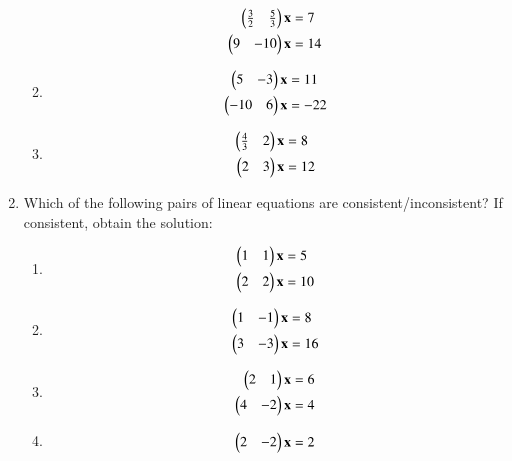 \begin{enumerate}[label=\arabic*.,ref=\thesubsection.\theenumi]
\begin{enumerate}[itemsep=2pt]
\begin{align}
\begin{split}
\begin{pmatrix}\frac{3}{2} & \frac{5}{3} \end{pmatrix}\mathbf{x}&=7
\\
\begin{pmatrix}9 & -10 \end{pmatrix}\mathbf{x}&=14
\end{split}
\end{align}
\item
\begin{align}
\begin{split}
\begin{pmatrix}5 & -3 \end{pmatrix}\mathbf{x}&=11
\\
\begin{pmatrix}-10 & 6 \end{pmatrix}\mathbf{x}&=-22
\end{split}
\end{align}
\item
\begin{align}
\begin{split}
\begin{pmatrix}\frac{4}{3} & 2 \end{pmatrix}\mathbf{x}&=8
\\
\begin{pmatrix}2 & 3 \end{pmatrix}\mathbf{x}&=12
\end{split}
\end{align}
\end{enumerate}
%
\item Which of the following pairs of linear equations are consistent/inconsistent? If consistent, obtain the solution:
%
\begin{enumerate}[itemsep=2pt]
\item
\begin{align}
\begin{split}
\begin{pmatrix}1 & 1 \end{pmatrix}\mathbf{x}&=5
\\
\begin{pmatrix}2 & 2 \end{pmatrix}\mathbf{x}&=10
\end{split}
\end{align}
\item
\begin{align}
\begin{split}
\begin{pmatrix}1 & -1 \end{pmatrix}\mathbf{x}&=8
\\
\begin{pmatrix}3 & -3 \end{pmatrix}\mathbf{x}&=16
\end{split}
\end{align}
\item
\begin{align}
\begin{split}
\begin{pmatrix}2 & 1 \end{pmatrix}\mathbf{x}&=6
\\
\begin{pmatrix}4 & -2 \end{pmatrix}\mathbf{x}&=4
\end{split}
\end{align}
\item
\begin{align}
\begin{split}
\myvec{2 & -2 }\vec{x}&=2
\\

\end{split}
\end{align}
\end{enumerate}
\end{enumerate}
